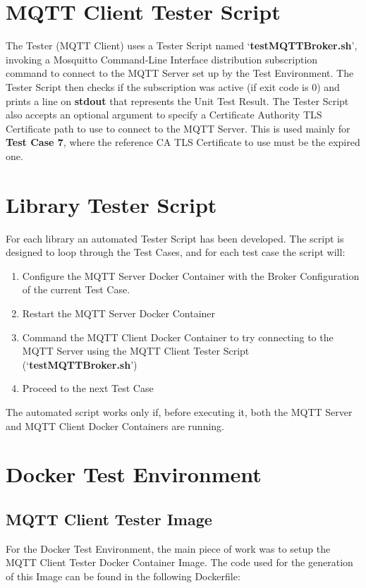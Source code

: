 \documentclass[binding=0.6cm,noexaminfo]{sapthesis}
\begin{document}
\section{MQTT Client Tester Script}

The Tester (MQTT Client) uses a Tester Script named `\textbf{testMQTTBroker.sh}', invoking a Mosquitto Command-Line Interface distribution subscription command to connect to the MQTT Server set up by the Test Environment. The Tester Script then checks if the subscription was active (if exit code is 0) and prints a line on \textbf{stdout} that represents the Unit Test Result.
The Tester Script also accepts an optional argument to specify a Certificate Authority TLS Certificate path to use to connect to the MQTT Server. This is used mainly for \textbf{Test Case 7}, where the reference CA TLS Certificate to use must be the expired one.
\section{Library Tester Script}

For each library an automated Tester Script has been developed. The script is designed to loop through the Test Cases, and for each test case the script will:
\begin{enumerate}
	\item Configure the MQTT Server Docker Container with the Broker Configuration of the current Test Case.
	\item Restart the MQTT Server Docker Container
	\item Command the MQTT Client Docker Container to try connecting to the MQTT Server using the MQTT Client Tester Script (`\textbf{testMQTTBroker.sh}')
	\item Proceed to the next Test Case
\end{enumerate}
The automated script works only if, before executing it, both the MQTT Server and MQTT Client Docker Containers are running.

\section{Docker Test Environment}
\subsection{MQTT Client Tester Image}
For the Docker Test Environment, the main piece of work was to setup the MQTT Client Tester Docker Container Image. The code used for the generation of this Image can be found in the following Dockerfile:

\end{document}
